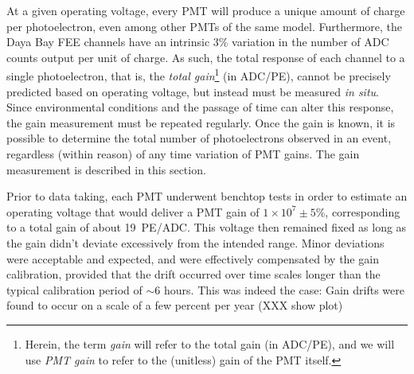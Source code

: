 \documentclass[../thesis.tex]{subfiles}
\begin{document}
At a given operating voltage, every PMT will produce a unique amount of charge
per photoelectron, even among other PMTs of the same model. Furthermore, the
Daya Bay FEE channels have an intrinsic 3\% variation in the number of ADC
counts output per unit of charge. As such, the total response of each channel to
a single photoelectron, that is, the \emph{total gain}\footnote{Herein, the term
  \emph{gain} will refer to the total gain (in ADC/PE), and we will use
  \emph{PMT gain} to refer to the (unitless) gain of the PMT itself.} (in
ADC/PE), cannot be precisely predicted based on operating voltage, but instead
must be measured \emph{in situ}. Since environmental conditions and the passage
of time can alter this response, the gain measurement must be repeated
regularly. Once the gain is known, it is possible to determine the total number
of photoelectrons observed in an event, regardless (within reason) of any time
variation of PMT gains. The gain measurement is described in this section.

Prior to data taking, each PMT underwent benchtop tests in order to estimate an
operating voltage that would deliver a PMT gain of $1 \times 10^7 \pm 5\%$,
corresponding to a total gain of about 19~PE/ADC. This voltage then remained
fixed as long as the gain didn't deviate excessively from the intended
range. Minor deviations were acceptable and expected, and were effectively
compensated by the gain calibration, provided that the drift occurred over time
scales longer than the typical calibration period of $\sim$6 hours. This was
indeed the case: Gain drifts were found to occur on a scale of a few percent per
year (XXX show plot)
\end{document}
